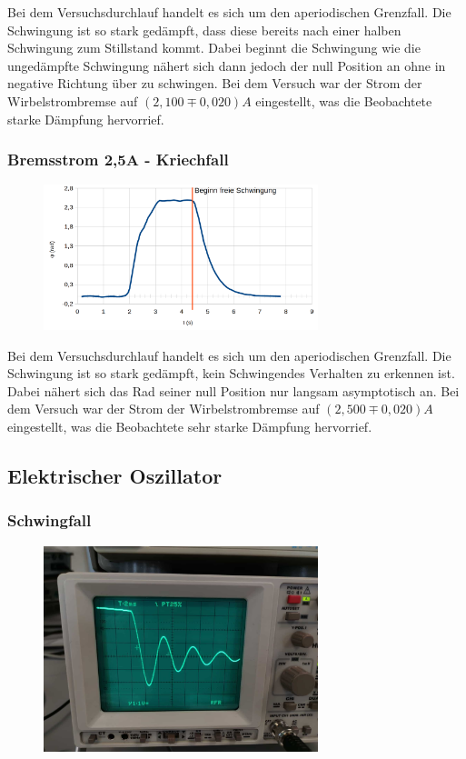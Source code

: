 \documentclass[a4paper]{scrartcl}
\numberwithin{equation}{subsection}
\begin{document}
Bei dem Versuchsdurchlauf handelt es sich um den aperiodischen Grenzfall. Die Schwingung ist so stark gedämpft, dass diese bereits nach einer halben Schwingung zum Stillstand kommt. Dabei beginnt die Schwingung wie die ungedämpfte Schwingung nähert sich dann jedoch der null Position an ohne in negative Richtung über zu schwingen. Bei dem Versuch war der Strom der Wirbelstrombremse auf $(2,100\mp0,020)A$ eingestellt, was die Beobachtete starke Dämpfung hervorrief.

\subsubsection{Bremsstrom 2,5A - Kriechfall}

\begin{figure}[H]
\includegraphics[width=8cm]{Messung_Rad_graph_25A}
\centering
\end{figure}

Bei dem Versuchsdurchlauf handelt es sich um den aperiodischen Grenzfall. Die Schwingung ist so stark gedämpft, kein Schwingendes Verhalten zu erkennen ist. Dabei nähert sich das Rad seiner null Position nur langsam asymptotisch an. Bei dem Versuch war der Strom der Wirbelstrombremse auf $(2,500\mp0,020)A$ eingestellt, was die Beobachtete sehr starke Dämpfung hervorrief.

\subsection{Elektrischer Oszillator}
\subsubsection{Schwingfall}

\begin{figure}[H]
\includegraphics[width=8cm]{Bild_Osziloskop-Schwingung}
\centering
\end{figure}
\end{document}
